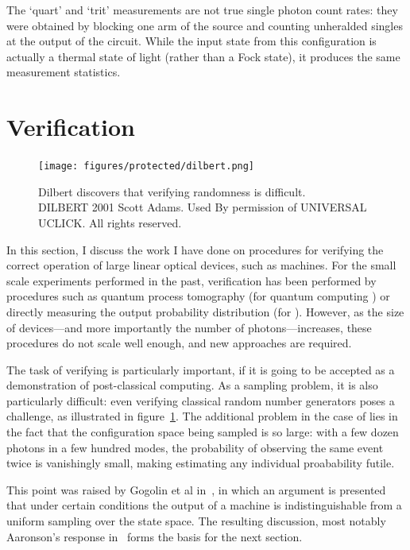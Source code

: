 The `quart' and `trit' measurements are not true single photon count rates: they
were obtained by blocking one arm of the source and counting unheralded singles
at the output of the circuit. While the input state from this configuration is
actually a thermal state of light (rather than a Fock state), it produces the
same measurement statistics.

\section{Verification}
\label{sec:Verification}
\begin{figure}[t]
  \centering
  \texttt{[image: figures/protected/dilbert.png]}
  \caption[Dilbert discovers that verifying randomness is difficult.]
  {Dilbert discovers that verifying randomness is difficult.\\DILBERT
  \textcopyright{} 2001 Scott Adams. Used By permission of UNIVERSAL UCLICK. All
  rights reserved.}
  \label{fig:dilbert}
\end{figure}
In this section, I discuss the work I have done on procedures for verifying the
correct operation of large linear optical devices, such as \bosonsampling{}
machines. For the small scale experiments performed in the past, verification
has been performed by procedures such as quantum process tomography (for
quantum computing \cite{qpt}) or directly measuring the output
probability distribution (for \bosonsampling{} \cite{bs-oxford, bs-rome,
bs-brisbane, bs-vienna}). However, as the size of
devices---and more importantly the number of photons---increases, these
procedures do not scale well enough, and new approaches are required.

The task of verifying \bosonsampling{} is particularly important, if it is going
to be accepted as a demonstration of post-classical computing. As a sampling
problem, it is also particularly difficult: even verifying classical random
number generators poses a challenge, as illustrated in figure~\ref{fig:dilbert}.
The additional problem in the case of \bosonsampling{} lies in the fact that the
configuration space being sampled is so large: with a few dozen photons in a few
hundred modes, the probability of observing the same event twice is vanishingly
small, making estimating any individual proabability futile.

This point was raised by Gogolin et al in~\cite{gogolin}, in which an argument
is presented that under certain conditions the output of a \bosonsampling{}
machine is indistinguishable from a uniform sampling over the state space. The
resulting discussion, most notably Aaronson's response in~\cite{notuniform}
forms the basis for the next section.

